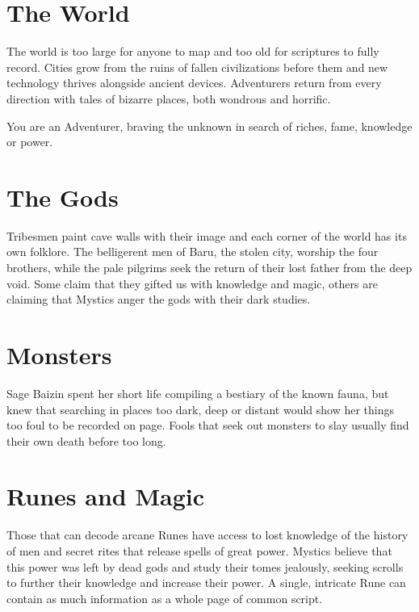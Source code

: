 \documentclass[itdr]{subfiles}
\begin{document}
\toc[2] %

\clearpage


\section*{The World}

The world is too large for anyone to map and too old for scriptures to fully record. Cities grow from the ruins of fallen civilizations before them and new technology thrives alongside ancient devices. Adventurers return from every direction with tales of bizarre places, both wondrous and horrific.

You are an Adventurer, braving the unknown in search of riches, fame, knowledge or power.

\section*{The Gods}

Tribesmen paint cave walls with their image and each corner of the world has its own folklore. The belligerent men of Baru, the stolen city, worship the four brothers, while the pale pilgrims seek the return of their lost father from the deep void. Some claim that they gifted us with knowledge and magic, others are claiming that Mystics anger the gods with their dark studies.

\section*{Monsters}

Sage Baizin spent her short life compiling a bestiary of the known fauna, but knew that searching in places too dark, deep or distant would show her things too foul to be recorded on page. Fools that seek out monsters to slay usually find their own death before too long.

\section*{Runes and Magic}
Those that can decode arcane Runes have access to lost knowledge of the history of men and secret rites that release spells of great power. Mystics believe that this power was left by dead gods and study their tomes jealously, seeking scrolls to further their knowledge and increase their power. A single, intricate Rune can contain as much information as a whole page of common script.
\end{document}

